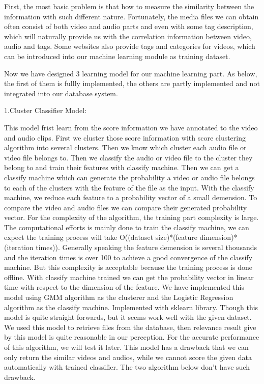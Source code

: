\documentclass{report}
\begin{document}
First, the most basic problem is that how to measure the similarity between the information with such different nature. Fortunately, the media files we can obtain often consist of both video and audio parts and even with some tag description, which will naturally provide us with the correlation information between video, audio and tags. Some websites also provide tags and categories for videos, which can be introduced into our machine learning module as training dataset.
 
Now we have designed 3 learning model for our machine learning part. As below, the first of them is fullly implemented, the others are partly implemented and not integrated into our database system.

1.Cluster Classifier Model:

This model frist learn from the score information we have annotated to the video and audio clips. First we cluster those score information with score clustering algorithm into several clusters. Then we know which cluster each audio file or video file belongs to. Then we classify the audio or video file to the cluster they belong to and train their features with classify machine. Then we can get a classify machine which can generate the probability a video or audio file belongs to each of the clusters with the feature of the file as the input. With the classify machine, we reduce each feature to a probability vector of a small demension. To compare the video and audio files we can compare their generated probability vector. 
For the complexity of the algorithm, the training part complexity is large. The computational efforts is mainly done to train the classify machine, we can expect the training process will take O((dataset size)*(feature dimension)*(iteration times)). Generally speaking the feature demension is several thousands and the iteration times is over 100 to achieve a good convergence of the classify machine. But this complexity is acceptable because the training process is done offline. With classify machine trained we can get the probability vector in linear time with respect to the dimension of the feature.
We have implemented this model using GMM algorithm as the clusterer and the Logistic Regression algorithm as the classify machine. Implemented with sklearn library.
Though this model is quite straight forwards, but it seems work well with the given dataset. We used this model to retrieve files from the database, then relevance result give by this model is quite reasonable in our perception. For the accurate performance of this algorithm, we will test it later.
This model has a drawback that we can only return the similar videos and audios, while we cannot score the given data automatically with trained classifier. The two algorithm below don’t have such drawback.
\end{document}
